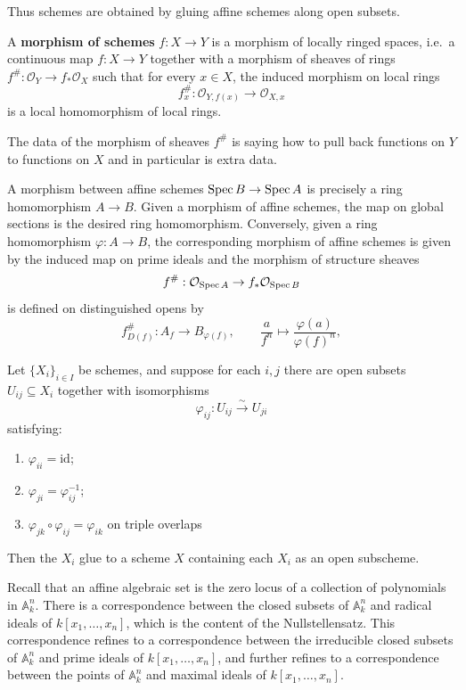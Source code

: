 \documentclass[12pt]{article}
\begin{document}
Thus schemes are obtained by gluing affine schemes along open subsets.

\begin{definition}
    A \textbf{morphism of schemes} $f:X\to Y$ is a morphism of locally ringed spaces, i.e.\ a continuous map $f:X\to Y$ together with a morphism of sheaves of rings $f^\#:\mathcal O_Y\to f_*\mathcal O_X$ such that for every $x\in X$, the induced morphism on local rings
    \[
        f^\#_x:\mathcal O_{Y,f(x)}\to \mathcal O_{X,x}
    \]
    is a local homomorphism of local rings.
\end{definition}
The data of the morphism of sheaves $f^\#$ is saying how to pull back functions on $Y$ to functions on $X$ and in particular is extra data.

\begin{remark}
    A morphism between affine schemes $\operatorname{Spec} B \to \operatorname{Spec} A$ is precisely a ring homomorphism $A \to B$. Given a morphism of affine schemes, the map on global sections is the desired ring homomorphism. Conversely, given a ring homomorphism $\varphi: A \to B$, the corresponding morphism of affine schemes is given by the induced map on prime ideals and the morphism of structure sheaves
    \[
        f^\#:\mathcal O_{\operatorname{Spec} A} \to f_*\mathcal O_{\operatorname{Spec} B}
    \]
    is defined on distinguished opens by
    \[
        f^\#_{D(f)}: A_f \longrightarrow B_{\varphi(f)}, \qquad \frac{a}{f^n} \mapsto \frac{\varphi(a)}{\varphi(f)^n},
    \]
\end{remark}

\begin{proposition}
    Let $\{X_i\}_{i\in I}$ be schemes, and suppose for each $i,j$ there are open subsets $U_{ij}\subseteq X_i$ together with isomorphisms
    \[
        \varphi_{ij}:U_{ij}\xrightarrow{\sim} U_{ji}
    \]
    satisfying:
    \begin{enumerate}
        \item $\varphi_{ii}=\mathrm{id}$;
        \item $\varphi_{ji}=\varphi_{ij}^{-1}$;
        \item $\varphi_{jk}\circ \varphi_{ij}=\varphi_{ik}$ on triple overlaps
    \end{enumerate}
    Then the $X_i$ glue to a scheme $X$ containing each $X_i$ as an open subscheme.
\end{proposition}

Recall that an affine algebraic set is the zero locus of a collection of polynomials in $\mathbb A^n_k$. There is a correspondence between the closed subsets of $\mathbb A^n_k$ and radical ideals of $k[x_1,\dots,x_n]$, which is the content of the Nullstellensatz. This correspondence refines to a correspondence between the irreducible closed subsets of $\mathbb A^n_k$ and prime ideals of $k[x_1,\dots,x_n]$, and further refines to a correspondence between the points of $\mathbb A^n_k$ and maximal ideals of $k[x_1,\dots,x_n]$.
\end{document}
